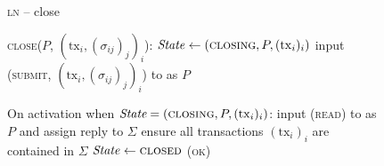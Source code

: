 \begin{figure}[H]
  \begin{processbox}{\textsc{ln} -- close}
    \begin{algorithmic}[1]
      \State \textsc{close}($P$, $(\mathrm{tx}_i, (\sigma_{ij})_j)_i$):
      \Indent
        \State {}
        \State $\mathit{State} \gets (\textsc{closing}, P, (\mathrm{tx}_i)_i)$
        \State input (\textsc{submit}, $(\mathrm{tx}_i, (\sigma_{ij})_j)_i$)
        to \ledger as $P$
      \EndIndent
      \Statex

      \State On activation when $\textit{State} = (\textsc{closing}, P,
      (\mathrm{tx}_i)_i)$:
      \Indent
        \State input (\textsc{read}) to \ledger as $P$ and assign reply to
        $\Sigma$
        \State ensure all transactions $(\mathrm{tx}_i)_i$ are contained in
        $\Sigma$
        \State $\mathit{State} \gets \textsc{closed}$
        \State \Return (\textsc{ok})
      \EndIndent
    \end{algorithmic}
  \end{processbox}
  \caption{}
  \label{code:ln:virtual}
\end{figure}
